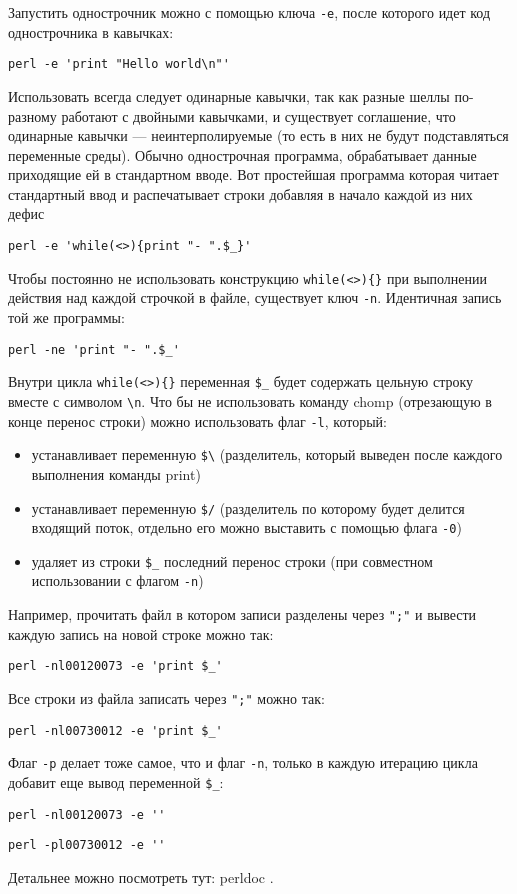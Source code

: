 Запустить однострочник можно с помощью ключа \verb|-e|, после которого идет код однострочника в кавычках:
\begin{verbatim}
perl -e 'print "Hello world\n"'
\end{verbatim}
Использовать всегда следует одинарные кавычки, так как разные шеллы по-разному работают с двойными кавычками, и существует соглашение, что одинарные кавычки --- неинтерполируемые (то есть в них не будут подставляться переменные среды). Обычно однострочная программа, обрабатывает данные приходящие ей в стандартном вводе. Вот простейшая программа которая читает стандартный ввод и распечатывает строки добавляя в начало каждой из них дефис
\begin{verbatim}
perl -e 'while(<>){print "- ".$_}'
\end{verbatim}
Чтобы постоянно не использовать конструкцию \verb|while(<>){}| при выполнении действия над каждой строчкой в файле, существует ключ \verb|-n|. Идентичная запись той же программы:
\begin{verbatim}
perl -ne 'print "- ".$_'
\end{verbatim}
Внутри цикла \verb|while(<>){}| переменная \verb|$_| будет содержать цельную строку вместе с символом \verb|\n|. Что бы не использовать команду chomp (отрезающую в конце перенос строки) можно использовать флаг \verb|-l|, который:
\begin{itemize}
  \item устанавливает переменную \verb|$\| (разделитель, который выведен после каждого выполнения команды print)
  \item устанавливает переменную \verb|$/| (разделитель по которому будет делится входящий поток, отдельно его можно выставить с помощью флага \verb|-0|)
  \item удаляет из строки \verb|$_| последний перенос строки (при совместном использовании с флагом \verb|-n|)
\end{itemize}
Например, прочитать файл в котором записи разделены через \verb|";"| и вывести каждую запись на новой строке можно так:
\begin{verbatim}
perl -nl00120073 -e 'print $_'
\end{verbatim}
Все строки из файла записать через \verb|";"| можно так:
\begin{verbatim}
perl -nl00730012 -e 'print $_'
\end{verbatim}
Флаг \verb|-p| делает тоже самое, что и флаг \verb|-n|, только в каждую итерацию цикла добавит еще вывод переменной \verb|$_|:
\begin{verbatim}
perl -nl00120073 -e ''
\end{verbatim}
\begin{verbatim}
perl -pl00730012 -e ''
\end{verbatim}
Детальнее можно посмотреть тут: perldoc .

